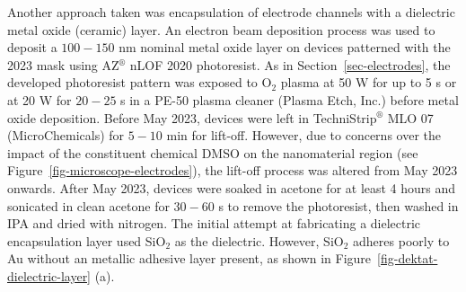 \documentclass[
  a4paper,
]{scrbook}
\begin{document}
Another approach taken was encapsulation of electrode channels with a
dielectric metal oxide (ceramic) layer. An electron beam deposition
process was used to deposit a \(100 - 150\) nm nominal metal oxide layer
on devices patterned with the 2023 mask using AZ\(^\circledR\) nLOF 2020
photoresist. As in Section~\ref{sec-electrodes}, the developed
photoresist pattern was exposed to O\(_2\) plasma at 50 W for up to 5 s
or at 20 W for \(20 - 25\) s in a PE-50 plasma cleaner (Plasma Etch,
Inc.) before metal oxide deposition. Before May 2023, devices were left
in TechniStrip\(^\circledR\) MLO 07 (MicroChemicals) for \(5 - 10\) min
for lift-off. However, due to concerns over the impact of the
constituent chemical DMSO on the nanomaterial region (see
Figure~\ref{fig-microscope-electrodes}), the lift-off process was
altered from May 2023 onwards. After May 2023, devices were soaked in
acetone for at least 4 hours and sonicated in clean acetone for
\(30 - 60\) s to remove the photoresist, then washed in IPA and dried
with nitrogen. The initial attempt at fabricating a dielectric
encapsulation layer used SiO\(_2\) as the dielectric. However, SiO\(_2\)
adheres poorly to Au without an metallic adhesive layer present, as
shown in Figure~\ref{fig-dektat-dielectric-layer} (a).
\end{document}
